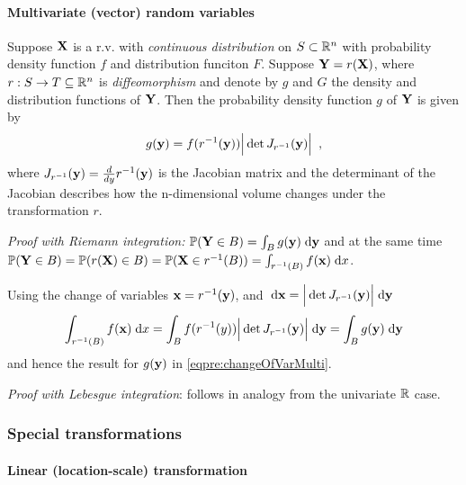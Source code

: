 \paragraph{Multivariate (vector) random variables}

\begin{theorem}
Suppose $\mathbf{X}$ is a r.v. with \emph{continuous distribution} on $S \subset \mathbb{R}^n$ with probability density function $f$ and distribution funciton $F$. Suppose $\mathbf{Y} = r(\mathbf{X})$, where $r : S \to T \subseteq \mathbb{R}^n$ is \emph{diffeomorphism} and denote by $g$ and $G$ the density and distribution functions of $\mathbf{Y}$.
Then the probability density function $g$ of $\mathbf{Y}$ is given by
\begin{equation}\label{eqpre:changeOfVarMulti}
g(\mathbf{y}) = f(r^{-1}(\mathbf{y})) \Big\lvert \det J_{r^{-1}}(\mathbf{y}) \Big\rvert \enspace ,
\end{equation}
where $J_{r^{-1}}(\mathbf{y}) = \frac{d}{dy} r^{-1}(\mathbf{y})$ is the Jacobian matrix and the determinant of the Jacobian describes how the n-dimensional volume changes under the transformation $r$.
\end{theorem}

\emph{Proof with Riemann integration:} $\mathbb{P}(\mathbf{Y} \in B) = \int_B g(\mathbf{y}) \; \text{d} \mathbf{y}$ and at the same time
$\mathbb{P}(\mathbf{Y} \in B) = \mathbb{P}(r(\mathbf{X}) \in B) = \mathbb{P}(\mathbf{X} \in r^{-1}(B)) = \int_{r^{-1}(B)} f(\mathbf{x}) \; \text{d} x$.

Using the change of variables $\mathbf{x} = r^{-1}(\mathbf{y})$, and $\; \text{d} \mathbf{x} = \Big\lvert \det J_{r^{-1}}(\mathbf{y}) \Big\rvert \; \text{d} \mathbf{y}$
\begin{equation}
\int_{r^{-1}(B)} f(\mathbf{x}) \; \text{d} x = \int_{B} f(r^{-1}(y)) \Big\lvert \det J_{r^{-1}}(\mathbf{y}) \Big\rvert \; \text{d} \mathbf{y} = \int_B g(\mathbf{y}) \; \text{d} \mathbf{y}
\end{equation}
and hence the result for $g(\mathbf{y})$ in \eqref{eqpre:changeOfVarMulti}.

\emph{Proof with Lebesgue integration}: follows in analogy from the univariate $\mathbb{R}$ case.


\subsubsection{Special transformations}


\paragraph{Linear (location-scale) transformation}

